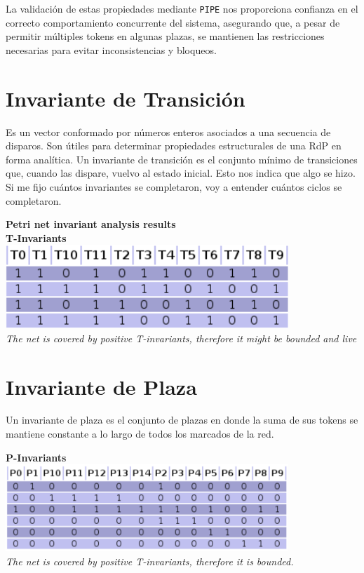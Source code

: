 \documentclass[12pt]{article}
\begin{document}
\bigskip

La validación de estas propiedades mediante \texttt{PIPE} nos proporciona confianza en el correcto comportamiento concurrente del sistema, asegurando que, a pesar de permitir múltiples tokens en algunas plazas, se mantienen las restricciones necesarias para evitar inconsistencias y bloqueos.

\section{Invariante de Transición}
Es un vector conformado por números enteros asociados a una secuencia de disparos. Son útiles para determinar propiedades estructurales de una RdP en forma analítica. Un invariante de transición es el conjunto mínimo de transiciones que, cuando las dispare, vuelvo al estado inicial. Esto nos indica que algo se hizo. Si me fijo cuántos invariantes se completaron, voy a entender cuántos ciclos se completaron.

\begin{center}
    \textbf{Petri net invariant analysis results}\\
    \textbf{T-Invariants}\\
    \includegraphics[width=0.8\textwidth]{T-invariants.png}\\
    \textit{The net is covered by positive T-invariants, therefore it might be bounded and live}
\end{center}

\section{Invariante de Plaza}
Un invariante de plaza es el conjunto de plazas en donde la suma de sus tokens se mantiene constante a lo largo de todos los marcados de la red.

\begin{center}
    \textbf{P-Invariants}\\
    \includegraphics[width=0.8\textwidth]{P-invariants.png}\\
    \textit{The net is covered by positive T-invariants, therefore it is bounded.}
\end{center}
\end{document}
